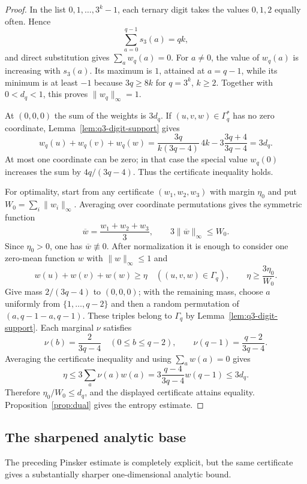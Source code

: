 \documentclass[10pt,a4paper]{amsart}
\theoremstyle{definition}
\newcommand{\1}{\mathbf 1}
\begin{document}
\begin{proof}
In the list $0,1,\ldots,3^k-1$, each ternary digit takes the values $0,1,2$ equally often.  Hence
\[
 \sum_{a=0}^{q-1}s_3(a)=qk,
\]
and direct substitution gives $\sum_aw_q(a)=0$.  For $a\ne0$, the value of $w_q(a)$ is increasing with $s_3(a)$.  Its maximum is $1$, attained at $a=q-1$, while its minimum is at least $-1$ because $3q\ge8k$ for $q=3^k$, $k\ge2$.  Together with $0<d_q<1$, this proves $\lVert w_q\rVert_\infty=1$.

At $(0,0,0)$ the sum of the weights is $3d_q$.  If $(u,v,w)\in\Gamma_q^\ast$ has no zero coordinate, Lemma~\ref{lem:q3-digit-support} gives
\[
 w_q(u)+w_q(v)+w_q(w)
 =\frac{3q}{k(3q-4)}\,4k-3\frac{3q+4}{3q-4}=3d_q.
\]
At most one coordinate can be zero; in that case the special value $w_q(0)$ increases the sum by $4q/(3q-4)$.  Thus the certificate inequality holds.

For optimality, start from any certificate $(w_1,w_2,w_3)$ with margin $\eta_0$ and put $W_0=\sum_i\lVert w_i\rVert_\infty$.  Averaging over coordinate permutations gives the symmetric function
\[
 \overline w=\frac{w_1+w_2+w_3}{3},
 \qquad3\lVert\overline w\rVert_\infty\le W_0.
\]
Since $\eta_0>0$, one has $\overline w\not\equiv0$.  After normalization it is enough to consider one zero-mean function $w$ with $\lVert w\rVert_\infty\le1$ and
\[
 w(u)+w(v)+w(w)\ge\eta\quad((u,v,w)\in\Gamma_q),
 \qquad\eta\ge\frac{3\eta_0}{W_0}.
\]
Give mass $2/(3q-4)$ to $(0,0,0)$; with the remaining mass, choose $a$ uniformly from $\{1,\ldots,q-2\}$ and then a random permutation of $(a,q-1-a,q-1)$.  These triples belong to $\Gamma_q$ by Lemma~\ref{lem:q3-digit-support}.  Each marginal $\nu$ satisfies
\[
 \nu(b)=\frac{2}{3q-4}\quad(0\le b\le q-2),
 \qquad \nu(q-1)=\frac{q-2}{3q-4}.
\]
Averaging the certificate inequality and using $\sum_aw(a)=0$ gives
\[
 \eta\le3\sum_a\nu(a)w(a)
 =3\frac{q-4}{3q-4}w(q-1)\le3d_q.
\]
Therefore $\eta_0/W_0\le d_q$, and the displayed certificate attains equality.  Proposition~\ref{prop:dual} gives the entropy estimate.
\end{proof}

\subsection{The sharpened analytic base}

The preceding Pinsker estimate is completely explicit, but the same certificate gives a substantially sharper one-dimensional analytic bound.
\end{document}
